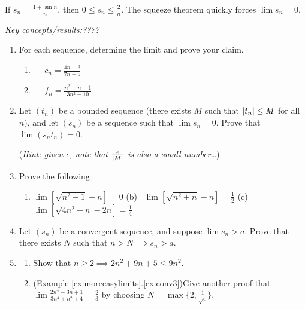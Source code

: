 \begin{example}{}{}
	If $s_n=\frac{1+\sin n}n$, then $0\le s_n\le \frac 2n$. The squeeze theorem quickly forces $\lim s_n=0$.
\end{example}

\vfil

\begin{exercises}{}{}
	\emph{Key concepts/results:\quad ????}

	\begin{enumerate}
	  \item For each sequence, determine the limit and prove your claim.
	  \begin{enumerate}
	    \item{} \  \ $c_n=\frac{4n+3}{7n-5}$
	    \setcounter{enumii}{3}
	    \item{} \  \ $f_n=\frac{n^2+n-1}{3n^2-10}$
	  \end{enumerate}
	
	
	  \item\label{exs:tbddproduct}%
	  Let $(t_n)$ be a bounded sequence (there exists $M$ such that $\left| t_n\right|\le M$ for all $n$), and let $(s_n)$ be a sequence such that $\lim s_n=0$. Prove that $\lim(s_nt_n)=0$.\par
	  (\emph{Hint: given $\epsilon$, note that $\frac\epsilon{\left| M\right|}$ is also a small number\ldots})
	 
	 
	  \item%
	  Prove the following
	  \begin{enumerate}
		  \item $\lim[\sqrt{n^2+1}-n]=0$ \hspace{30pt} (b) \ $\lim[\sqrt{n^2+n}-n]=\frac 12$\hspace{30pt} (c) \ $\lim[\sqrt{4n^2+n}-2n]=\frac 14$
	  \end{enumerate}
	  
	
	  \item\label{exs:convlowerbound}%
	  Let $(s_n)$ be a convergent sequence, and suppose $\lim s_n>a$. Prove that there exists $N$ such that $n>N\implies s_n>a$.
	  
	    
	  \item\label{exs:conv23again}
	  \begin{enumerate}
	    \item Show that $n\ge 2\implies 2n^2+9n+5\le 9n^2$.
	    \item (Example \ref*{ex:moreeasylimits}.\ref{ex:conv3})\quad Give another proof that $\lim \frac{2n^4-3n+1}{3n^4+n^2+4}=\frac 23$ by choosing $N=\max\{2,\frac 1{\sqrt\epsilon}\}$.
	 	\end{enumerate}
	 	

\end{enumerate}
\end{exercises}
